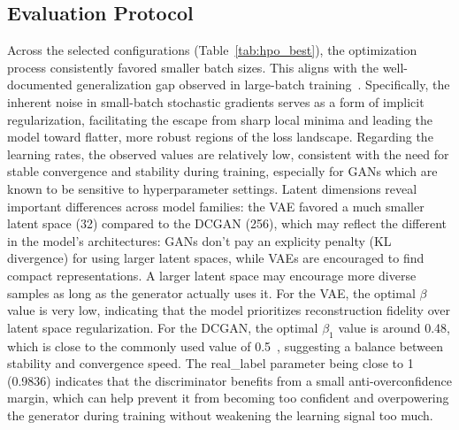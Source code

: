 \documentclass[runningheads]{llncs}
\begin{document}
\subsection{Evaluation Protocol}
Across the selected configurations (Table~\ref{tab:hpo_best}), 
the optimization process consistently favored smaller batch sizes. 
This aligns with the well-documented generalization gap observed in 
large-batch training~\cite{keskar}. Specifically, the inherent noise 
in small-batch stochastic gradients serves as a form of implicit 
regularization, facilitating the escape from sharp local minima and 
leading the model toward flatter, more robust regions of the loss 
landscape. Regarding the learning rates, the observed values
are relatively low, consistent with the need for stable convergence and
stability during training, especially for GANs which are known to be sensitive to hyperparameter settings.
Latent dimensions reveal important differences across model families: the VAE favored a much smaller 
latent space (32) compared to the DCGAN (256), which may reflect the different in the 
model's architectures: GANs don't pay an explicity penalty (KL divergence)
for using larger latent spaces, while VAEs are encouraged to find compact representations.
A larger latent space may encourage more diverse samples as long as the generator
actually uses it. For the VAE, the optimal $\beta$ value is very low, 
indicating that the model prioritizes reconstruction fidelity over latent space regularization.
For the DCGAN, the optimal $\beta_1$ value is around 0.48, which is close 
to the commonly used value of 0.5~\cite{dcgan}, suggesting a balance between stability and convergence speed. 
The real\_label parameter being close to 1 (0.9836) indicates that the discriminator 
benefits from a small anti-overconfidence margin, which can help prevent it from becoming too confident 
and overpowering the generator during training without weakening the learning signal too much.
\end{document}
